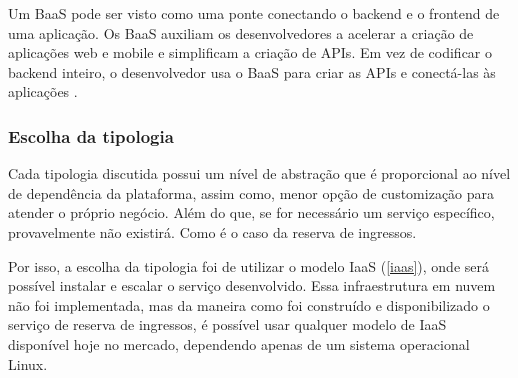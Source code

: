 \begin{citacao}
Um BaaS pode ser visto como uma ponte conectando o backend e o frontend de uma aplicação.
Os BaaS auxiliam os desenvolvedores a acelerar a criação de aplicações web e mobile e
simplificam a criação de APIs. Em vez de codificar o backend inteiro, o desenvolvedor usa
o BaaS para criar as APIs e conectá-las às aplicações \cite{backend-as-a-service-pros-e-contras}.
\end{citacao}

\subsubsection{Escolha da tipologia}

Cada tipologia discutida possui um nível de abstração que é proporcional ao nível de
dependência da plataforma, assim como, menor opção de customização para atender
o próprio negócio. Além do que, se for necessário um serviço específico, provavelmente
não existirá. Como é o caso da reserva de ingressos.

Por isso, a escolha da tipologia foi de utilizar o modelo IaaS (\autoref{iaas}),
onde será possível instalar e escalar o serviço desenvolvido.
Essa infraestrutura em nuvem não foi implementada, mas da maneira como foi construído
e disponibilizado o serviço de reserva de ingressos, é possível usar qualquer modelo
de IaaS disponível hoje no mercado, dependendo apenas de um sistema operacional
Linux.


